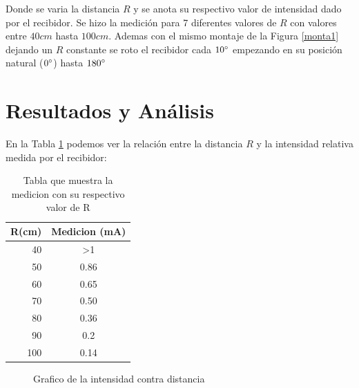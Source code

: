 \documentclass[aps,prl,reprint]{revtex4-1}
\begin{document}
Donde se varia la distancia $R$ y se anota su respectivo valor de intensidad dado por el recibidor. Se hizo la medición para 7 diferentes valores de $R$ con valores entre $40 cm$ hasta $100 cm$. Ademas con el mismo montaje de la Figura \ref{monta1} dejando un $R$ constante  se roto el recibidor cada $10\degree$ empezando en su posición natural ($0\degree$) hasta $180\degree$




\section{Resultados y An\'alisis}
En la Tabla \ref{tbmonta1.1} podemos ver la relación entre la distancia $R$ y la intensidad relativa medida por el recibidor:\\

\begin{table}[H]
\begin{center}

\begin{tabular}{|| r || c ||} 
\hline\hline
R(cm) & Medicion (mA) \\ \hline
40             & \textgreater 1        \\ \hline
50             & 0.86              \\ \hline
60             & 0.65              \\ \hline
70             & 0.50              \\ \hline
80             & 0.36              \\ \hline
90             & 0.2               \\ \hline
100            & 0.14              \\ \hline

\end{tabular}
\end{center}
\caption{Tabla que muestra la medicion con su respectivo valor de R}
\label{tbmonta1.1}
\end{table}


\begin{figure}[H]
 \caption{Grafico de la intensidad contra distancia}
 \label{gmonta1.1}
\end{figure}
\end{document}
